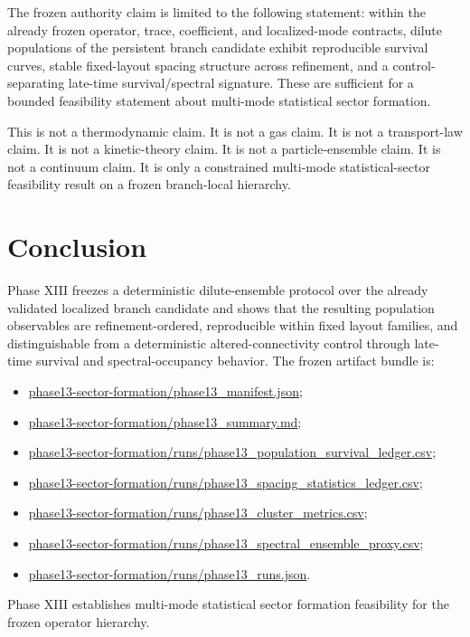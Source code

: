 \documentclass[11pt]{article}
\begin{document}
The frozen authority claim is limited to the following statement: within the already frozen operator, trace, coefficient, and localized-mode contracts, dilute populations of the persistent branch candidate exhibit reproducible survival curves, stable fixed-layout spacing structure across refinement, and a control-separating late-time survival/spectral signature. These are sufficient for a bounded feasibility statement about multi-mode statistical sector formation.

This is not a thermodynamic claim. It is not a gas claim. It is not a transport-law claim. It is not a kinetic-theory claim. It is not a particle-ensemble claim. It is not a continuum claim. It is only a constrained multi-mode statistical-sector feasibility result on a frozen branch-local hierarchy.

\section{Conclusion}

Phase XIII freezes a deterministic dilute-ensemble protocol over the already validated localized branch candidate and shows that the resulting population observables are refinement-ordered, reproducible within fixed layout families, and distinguishable from a deterministic altered-connectivity control through late-time survival and spectral-occupancy behavior. The frozen artifact bundle is:
\begin{itemize}
\item \url{phase13-sector-formation/phase13_manifest.json};
\item \url{phase13-sector-formation/phase13_summary.md};
\item \url{phase13-sector-formation/runs/phase13_population_survival_ledger.csv};
\item \url{phase13-sector-formation/runs/phase13_spacing_statistics_ledger.csv};
\item \url{phase13-sector-formation/runs/phase13_cluster_metrics.csv};
\item \url{phase13-sector-formation/runs/phase13_spectral_ensemble_proxy.csv};
\item \url{phase13-sector-formation/runs/phase13_runs.json}.
\end{itemize}

Phase XIII establishes multi-mode statistical sector formation feasibility for the frozen operator hierarchy.
\end{document}

